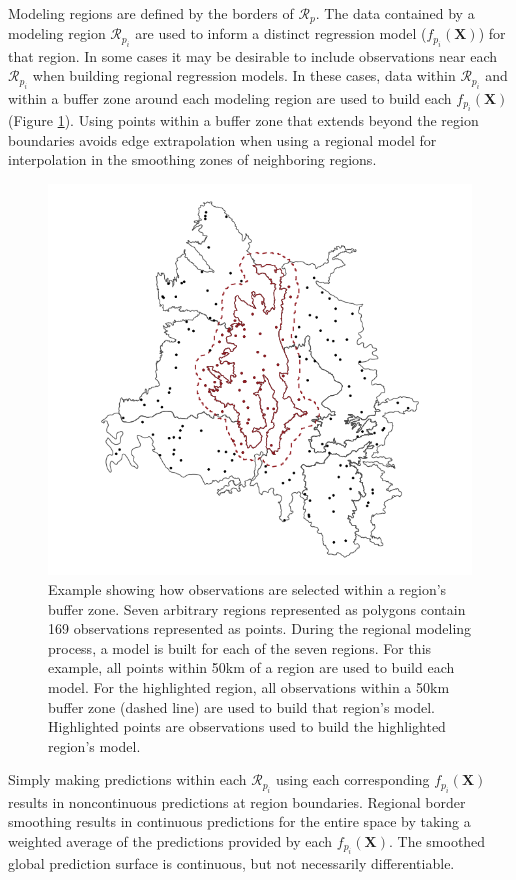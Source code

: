 Modeling regions are defined by the borders of $\mathcal{R}_p$. The data contained by a modeling region $\mathcal{R}_{p_i}$ are used to inform a distinct regression model ($f_{p_i}(\pmb{X})$) for that region. In some cases it may be desirable to include observations near each $\mathcal{R}_{p_i}$ when building regional regression models. In these cases, data within $\mathcal{R}_{p_i}$ and within a buffer zone around each modeling region are used to build each $f_{p_i}(\pmb{X})$ (Figure \ref{fig:buffer_example}). Using points within a buffer zone that extends beyond the region boundaries avoids edge extrapolation when using a regional model for interpolation in the smoothing zones of neighboring regions.

\begin{figure}[htbp]
    \centering
    \includegraphics[width = .7\textwidth]{figures/buffer_example.png}
    \caption{Example showing how observations are selected within a region's buffer zone. Seven arbitrary regions represented as polygons contain 169 observations represented as points. During the regional modeling process, a model is built for each of the seven regions. For this example, all points within 50km of a region are used to build each model. For the highlighted region, all observations within a 50km buffer zone (dashed line) are used to build that region's model. Highlighted points are observations used to build the highlighted region's model.}
    \label{fig:buffer_example}
\end{figure}

Simply making predictions within each $\mathcal{R}_{p_i}$ using each corresponding $f_{p_i}(\pmb{X})$ results in noncontinuous predictions at region boundaries. Regional border smoothing results in continuous predictions for the entire space by taking a weighted average of the predictions provided by each $f_{p_i}(\pmb{X})$. The smoothed global prediction surface is continuous, but not necessarily differentiable.

